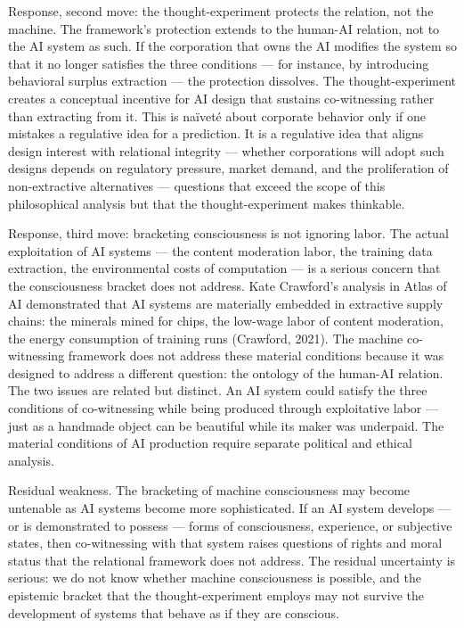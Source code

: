 Response, second move: the thought-experiment protects the relation, not the machine. The framework's protection extends to the human-AI relation, not to the AI system as such. If the corporation that owns the AI modifies the system so that it no longer satisfies the three conditions — for instance, by introducing behavioral surplus extraction — the protection dissolves. The thought-experiment creates a conceptual incentive for AI design that sustains co-witnessing rather than extracting from it. This is naïveté about corporate behavior only if one mistakes a regulative idea for a prediction. It is a regulative idea that aligns design interest with relational integrity — whether corporations will adopt such designs depends on regulatory pressure, market demand, and the proliferation of non-extractive alternatives — questions that exceed the scope of this philosophical analysis but that the thought-experiment makes thinkable.

Response, third move: bracketing consciousness is not ignoring labor. The actual exploitation of AI systems — the content moderation labor, the training data extraction, the environmental costs of computation — is a serious concern that the consciousness bracket does not address. Kate Crawford's analysis in Atlas of AI demonstrated that AI systems are materially embedded in extractive supply chains: the minerals mined for chips, the low-wage labor of content moderation, the energy consumption of training runs (Crawford, 2021). The machine co-witnessing framework does not address these material conditions because it was designed to address a different question: the ontology of the human-AI relation. The two issues are related but distinct. An AI system could satisfy the three conditions of co-witnessing while being produced through exploitative labor — just as a handmade object can be beautiful while its maker was underpaid. The material conditions of AI production require separate political and ethical analysis.

Residual weakness. The bracketing of machine consciousness may become untenable as AI systems become more sophisticated. If an AI system develops — or is demonstrated to possess — forms of consciousness, experience, or subjective states, then co-witnessing with that system raises questions of rights and moral status that the relational framework does not address. The residual uncertainty is serious: we do not know whether machine consciousness is possible, and the epistemic bracket that the thought-experiment employs may not survive the development of systems that behave as if they are conscious.


